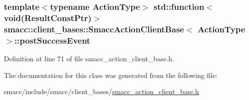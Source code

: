 \subsubsection[{\texorpdfstring{post\+Success\+Event}{postSuccessEvent}}]{\setlength{\rightskip}{0pt plus 5cm}template$<$typename Action\+Type$>$ std\+::function$<$void(Result\+Const\+Ptr)$>$ {\bf smacc\+::client\+\_\+bases\+::\+Smacc\+Action\+Client\+Base}$<$ Action\+Type $>$\+::post\+Success\+Event}\hypertarget{classsmacc_1_1client__bases_1_1SmaccActionClientBase_afb4f82508cd653d496392f321e84a783}{}\label{classsmacc_1_1client__bases_1_1SmaccActionClientBase_afb4f82508cd653d496392f321e84a783}


Definition at line 71 of file smacc\+\_\+action\+\_\+client\+\_\+base.\+h.



The documentation for this class was generated from the following file\+:\begin{DoxyCompactItemize}
\item 
smacc/include/smacc/client\+\_\+bases/\hyperlink{smacc__action__client__base_8h}{smacc\+\_\+action\+\_\+client\+\_\+base.\+h}\end{DoxyCompactItemize}
